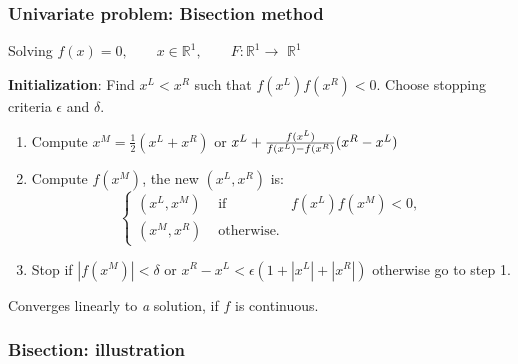 \documentclass[bigger]{beamer}
\begin{document}
\begin{frame}%

\frametitle{Univariate problem: Bisection method}

Solving $f(x)=0,\qquad x\in \mathbb{R}^{1},\qquad F:\mathbb{R}%
^{1}\rightarrow $ $\mathbb{R}^{1}$

\textbf{Initialization}: Find $x^{L}<x^{R}$ such that $f(x^{L})f(x^{R})<0$. 
\newline
Choose stopping criteria $\epsilon $ and $\delta $.

\begin{enumerate}
\item Compute $x^{M}=\frac{1}{2}(x^{L}+x^{R})$ or $x^{L}+\frac{f(x^{L})}{%
f(x^{L})-f(x^{R})}(x^{R}-x^{L})$
\item Compute $f(x^{M})$, the new $(x^{L},x^{R})$ is: 
\begin{equation*}
\left\{ 
\begin{array}{ccc}
(x^{L},x^{M}) & \mbox{ if } & f(x^{L})f(x^{M})<0, \\ 
(x^{M},x^{R}) & \mbox{ otherwise.} & 
\end{array}%
\right.
\end{equation*}

\item Stop if $|f(x^{M})|<\delta $ or $x^{R}-x^{L}<\epsilon
(1+|x^{L}|+|x^{R}|)$\newline
otherwise go to step 1.
\end{enumerate}

Converges linearly to \emph{a} solution, if $f$ is continuous.


\end{frame}%

\begin{frame}%
\frametitle{Bisection: illustration}


\end{frame}%
\end{document}

